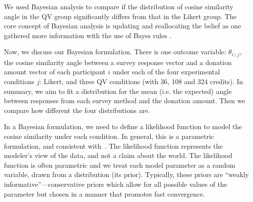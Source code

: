 We used Bayesian analysis to compare if the distribution of cosine similarity angle in the QV group significantly differs from that in the Likert group. The core concept of Bayesian analysis is updating and reallocating the belief as one gathered more information with the use of Bayes rules \cite{kruschke2010bayesian}.   


Now, we discuss our Bayesian formulation. There is one outcome variable: $\theta_{i \mid j}$, the cosine similarity angle between a survey response vector and a donation amount vector of each participant $i$  under each of the four experimental conditions $j$: Likert, and three QV conditions (with 36, 108 and 324 credits). In summary, we aim to fit a distribution for the mean (i.e. the expected) angle between responses from each survey method and the donation amount. Then we compare how different the four distributions are. 

In a Bayesian formulation, we need to define a likelihood function to model the cosine similarity under each condition. In general, this is a parametric formulation, and consistent with~\textcite{McElreath2015}. The likelihood function represents the modeler's view of the data, and not a claim about the world. The likelihood function is often parametric and we treat each model parameter as a random variable, drawn from a distribution (its prior). Typically, these priors are ``weakly informative''---conservative priors which allow for all possible values of the parameter but chosen in a manner that promotes fast convergence.



